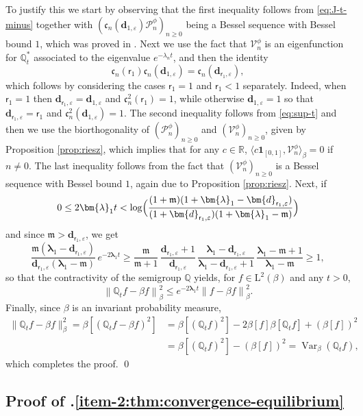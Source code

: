 \documentclass[10pt]{amsart}
\let\epsilon\varepsilon
\theoremstyle{plain}
\theoremstyle{definition}
\newcommand{\norm}[1]{\left\lVert#1\right\rVert}
\DeclareMathOperator{\Var}{Var}
\newcommand{\R}{\mathbb{R}}
\renewcommand{\P}{\mathcal{P}}
\newcommand{\V}{\mathcal{V}}
\newcommand{\J}{\mathds{Q}}
\newcommand{\Leb}{\mathrm{L}}
\newcommand{\m}{\mathfrak{m}}
\newcommand{\dpt}{\bm{d}_{\vat,\epsilon}}
\newcommand{\dz}{{\bm{d}}_{1,\epsilon}}
\newcommand{\lam}{{\bm{\lambda}_1}}
\newcommand{\vat}{{\mathsf{r}_1}}
\let\bpsi\beta
\begin{document}
To justify this we start by observing that the first inequality follows from \eqref{eq:J-t-minus} together with $(\mathfrak{c}_n(\dz)\P_n^\phi)_{n \geq 0}$ being a Bessel sequence with Bessel bound $1$, which was proved in . Next we use the fact that $\V_n^\phi$ is an eigenfunction for $\J_t^*$ associated to the eigenvalue $e^{-\lambda_n t}$, and then the identity
\begin{equation*}
\mathfrak{c}_n(\vat)\mathfrak{c}_n(\dz) = \mathfrak{c}_n(\dpt),
\end{equation*}
which follows by considering the cases $\vat = 1$ and $\vat < 1$ separately. Indeed, when $\vat = 1$ then $\dpt = \dz$ and $\mathfrak{c}_n^2(\vat) = 1$, while otherwise $\dz = 1$ so that $\dpt = \vat$ and $\mathfrak{c}_n^2(\dz) = 1$. The second inequality follows from \eqref{eq:sup-t} and then we use the biorthogonality of $(\P_n^\phi)_{n \geq 0}$ and $(\V_n^\phi)_{n \geq 0}$, given by Proposition \ref{prop:riesz}, which implies that for any $c \in \R$, $\langle c\bm{1}_{[0,1]}, \bm{\V}_n^\phi \rangle_{\bpsi} = 0$ if $n \neq 0$. The last inequality follows from the fact that $(\bm{\V}_n^\phi )_{n \geq 0}$ is a Bessel sequence with Bessel bound $1$, again due to Proposition \ref{prop:riesz}. Next, if
\[
0 \leq 2 \lam t < \log\Bigl(\frac{(1+\m)(1+\lam-\dpt)}{(1+\dpt)(1+\lam-\m)}\Bigr)
\]
and since $\m > \dpt$, we get
\begin{equation*}
\frac{\m(\lam-\dpt)}{\dpt(\lam-\m)}\, e^{-2\lam t} \geq \frac{\m}{\m+1}\, \frac{\dpt+1}{\dpt}\, \frac{\lam-\dpt}{\lam-\dpt+1}\, \frac{\lam-\m+1}{\lam-\m} \geq 1,
\end{equation*}
so that the contractivity of the semigroup $\J$ yields, for $f \in \Leb^2(\bpsi)$ and any $t > 0$,
\begin{equation*}
\norm{\J_t f - \bpsi f}_\bpsi^2 \leq e^{-2\lam t} \norm{f-\bpsi f}_\bpsi^2.
\end{equation*}
Finally, since $\bpsi$ is an invariant probability measure,
\begin{align*}
\|\J_t f - \bpsi f\|_\bpsi^2 = \bpsi[(\J_tf-\bpsi f)^2] &= \bpsi [ (\J_tf)^2 ] - 2 \bpsi [f] \bpsi [ \J_t f] + (\bpsi [f])^2\\
&= \bpsi [(\J_tf)^2] - (\bpsi [f])^2 = \Var_\bpsi(\J_tf),
\end{align*}
which completes the proof. \qed

\subsection{Proof of .\eqref{item-2:thm:convergence-equilibrium}}
\end{document}
